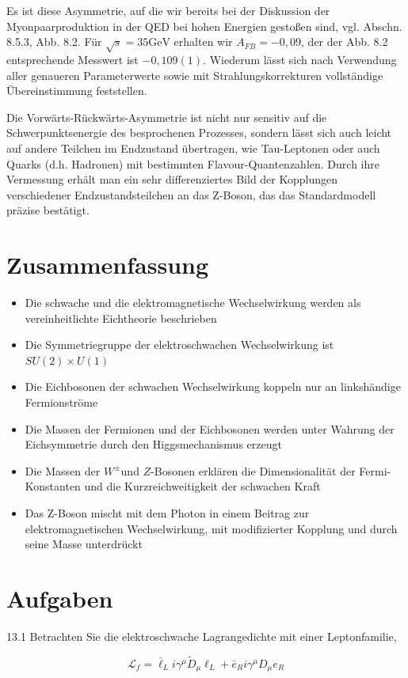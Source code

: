 \documentclass[10pt, letterpaper]{article}
\begin{document}
Es ist diese Asymmetrie, auf die wir bereits bei der Diskussion der Myonpaarproduktion in der QED bei hohen Energien gestoßen sind, vgl. Abschn. 8.5.3, Abb. 8.2. Für $\sqrt{s}=35 \mathrm{GeV}$ erhalten wir $A_{F B}=-0,09$, der der Abb. 8.2 entsprechende Messwert ist $-0,109(1)$. Wiederum lässt sich nach Verwendung aller genaueren Parameterwerte sowie mit Strahlungskorrekturen vollständige Übereinstimmung feststellen.

Die Vorwärts-Rückwärts-Asymmetrie ist nicht nur sensitiv auf die Schwerpunktsenergie des besprochenen Prozesses, sondern lässt sich auch leicht auf andere Teilchen im Endzustand übertragen, wie Tau-Leptonen oder auch Quarks (d.h. Hadronen) mit bestimmten Flavour-Quantenzahlen. Durch ihre Vermessung erhält man ein sehr differenziertes Bild der Kopplungen verschiedener Endzustandsteilchen an das Z-Boson, das das Standardmodell präzise bestätigt.

\section*{Zusammenfassung}
\begin{itemize}
  \item Die schwache und die elektromagnetische Wechselwirkung werden als vereinheitlichte Eichtheorie beschrieben
  \item Die Symmetriegruppe der elektroschwachen Wechselwirkung ist $S U(2) \times U(1)$
  \item Die Eichbosonen der schwachen Wechselwirkung koppeln nur an linkshändige Fermionströme
  \item Die Massen der Fermionen und der Eichbosonen werden unter Wahrung der Eichsymmetrie durch den Higgsmechanismus erzeugt
  \item Die Massen der $W^{ \pm}$und $Z$-Bosonen erklären die Dimensionalität der Fermi-Konstanten und die Kurzreichweitigkeit der schwachen Kraft
  \item Das Z-Boson mischt mit dem Photon in einem Beitrag zur elektromagnetischen Wechselwirkung, mit modifizierter Kopplung und durch seine Masse unterdrückt
\end{itemize}

\section*{Aufgaben}
13.1 Betrachten Sie die elektroschwache Lagrangedichte mit einer Leptonfamilie,

$$
\mathscr{L}_{f}=\bar{\ell}_{L} i \gamma^{\mu} \widetilde{D}_{\mu} \ell_{L}+\bar{e}_{R} i \gamma^{\mu} D_{\mu} e_{R}
$$
\end{document}
